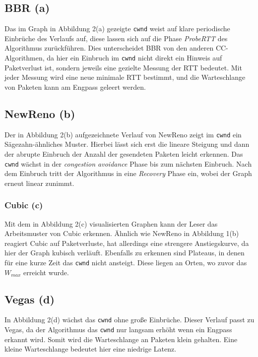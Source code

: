 \documentclass[paper=a4,fontsize=12pt,ngerman]{scrartcl}
\begin{document}
\subsection*{BBR (a)}

Das im Graph in Abbildung 2(a) gezeigte \texttt{cwnd} weist auf klare periodische Einbrüche des Verlaufs auf, diese lassen
sich auf die Phase \textit{ProbeRTT} des Algorithmus zurückführen. Dies unterscheidet BBR von den anderen
CC-Algorithmen, da hier ein Einbruch im \texttt{cwnd} nicht direkt ein Hinweis auf Paketverlust ist, sondern jeweils eine 
gezielte Messung der RTT bedeutet. Mit jeder Messung wird eine neue minimale RTT bestimmt, und die Warteschlange von Paketen
kann am Engpass geleert werden.

\subsection*{NewReno (b)}

Der in Abbildung 2(b) aufgezeichnete Verlauf von NewReno zeigt im \texttt{cwnd} ein Sägezahn-ähnliches Muster. Hierbei lässt sich erst
die lineare Steigung und dann der abrupte Einbruch der Anzahl der gesendeten Paketen leicht erkennen.
Das \texttt{cwnd} wächst in der \textit{congestion avoidance} Phase bis zum nächsten Einbruch.
Nach dem Einbruch tritt der Algorithmus in eine \textit{Recovery} Phase ein, wobei der Graph erneut linear zunimmt.

\subsubsection*{Cubic (c)}

Mit dem in Abbildung 2(c) visualisierten Graphen kann der Leser das Arbeitsmuster von Cubic erkennen.
Ähnlich wie NewReno in Abbildung 1(b) reagiert Cubic auf Paketverluste, hat allerdings eine strengere Anstiegskurve,
da hier der Graph kubisch verläuft. Ebenfalls zu erkennen sind Plateaus, in denen für eine kurze Zeit das 
\texttt{cwnd} nicht ansteigt. Diese liegen an Orten, wo zuvor das $W_{max}$ erreicht wurde.

\subsection*{Vegas (d)}

In Abbildung 2(d) wächst das \texttt{cwnd} ohne große Einbrüche. Dieser Verlauf passt zu Vegas, da der Algorithmus 
das \texttt{cwnd} nur langsam erhöht wenn ein Engpass erkannt wird. Somit wird die Warteschlange an Paketen klein gehalten.
Eine kleine Warteschlange bedeutet hier eine niedrige Latenz.
\end{document}
